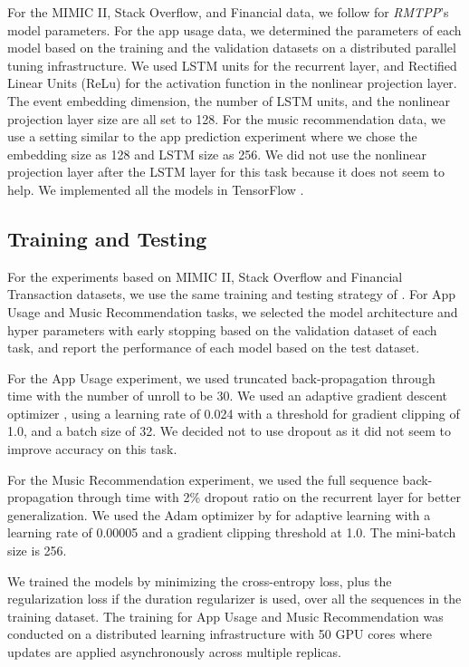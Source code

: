 \documentclass{article} %
\begin{document}
For the MIMIC II, Stack Overflow, and Financial data, we follow \citep{DuDaiTri16} for \emph{RMTPP}'s model parameters. For the app usage data, we determined the parameters of each model based on the training and the validation datasets on a distributed parallel tuning infrastructure. We used LSTM units \citep{Hochreiter:1997:LSM:1246443.1246450} for the recurrent layer, and Rectified Linear Units (ReLu) \citep{icml2010_NairH10} for the activation function in the nonlinear projection layer. The event embedding dimension, the number of LSTM units, and the nonlinear projection layer size are all set to 128. For the music recommendation data, we use a setting similar to the app prediction experiment where we chose the embedding size as 128 and LSTM size as 256. We did not use the nonlinear projection layer after the LSTM layer for this task because it does not seem to help. We implemented all the models in TensorFlow \citep{tensorflow}. 

\subsection{Training and Testing}

For the experiments based on MIMIC II, Stack Overflow and Financial Transaction datasets, we use the same training and testing strategy of \citep{DuDaiTri16}. For App Usage and Music Recommendation tasks, we selected the model architecture and hyper parameters with early stopping based on the validation dataset of each task, and report the performance of each model based on the test dataset. 

For the App Usage experiment, we used truncated back-propagation through time with the number of unroll to be 30. We used an adaptive gradient descent optimizer \citep{DBLP:journals/corr/abs-1212-5701}, using a learning rate of 0.024 with a threshold for gradient clipping of 1.0, and a batch size of 32. We decided not to use dropout as it did not seem to improve accuracy on this task.  

For the Music Recommendation experiment, we used the full sequence back-propagation through time with 2\% dropout ratio on the recurrent layer for better generalization. We used the Adam optimizer by \citep{DBLP:journals/corr/KingmaB14} for adaptive learning with a learning rate of 0.00005 and a gradient clipping threshold at 1.0. The mini-batch size is 256. 

We trained the models by minimizing the cross-entropy loss, plus the regularization loss if the duration regularizer is used, over all the sequences in the training dataset. The training for App Usage and Music Recommendation was conducted on a distributed learning infrastructure \citep{Dean:2012:LSD:2999134.2999271} with 50 GPU cores where updates are applied asynchronously across multiple replicas.
\end{document}
